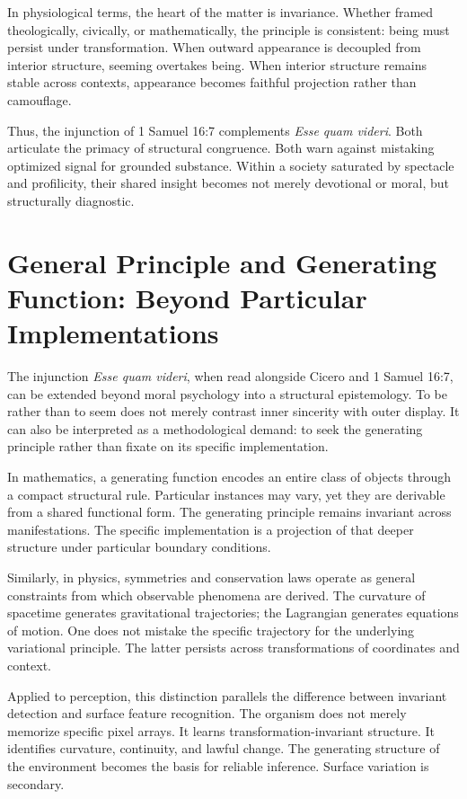 \documentclass[11pt]{article}
\begin{document}
In physiological terms, the heart of the matter is invariance. Whether framed theologically, civically, or mathematically, the principle is consistent: being must persist under transformation. When outward appearance is decoupled from interior structure, seeming overtakes being. When interior structure remains stable across contexts, appearance becomes faithful projection rather than camouflage.

Thus, the injunction of 1 Samuel 16:7 complements \textit{Esse quam videri}. Both articulate the primacy of structural congruence. Both warn against mistaking optimized signal for grounded substance. Within a society saturated by spectacle and profilicity, their shared insight becomes not merely devotional or moral, but structurally diagnostic.

\section{General Principle and Generating Function: Beyond Particular Implementations}

The injunction \textit{Esse quam videri}, when read alongside Cicero and 1 Samuel 16:7, can be extended beyond moral psychology into a structural epistemology. To be rather than to seem does not merely contrast inner sincerity with outer display. It can also be interpreted as a methodological demand: to seek the generating principle rather than fixate on its specific implementation.

In mathematics, a generating function encodes an entire class of objects through a compact structural rule. Particular instances may vary, yet they are derivable from a shared functional form. The generating principle remains invariant across manifestations. The specific implementation is a projection of that deeper structure under particular boundary conditions.

Similarly, in physics, symmetries and conservation laws operate as general constraints from which observable phenomena are derived. The curvature of spacetime generates gravitational trajectories; the Lagrangian generates equations of motion. One does not mistake the specific trajectory for the underlying variational principle. The latter persists across transformations of coordinates and context.

Applied to perception, this distinction parallels the difference between invariant detection and surface feature recognition. The organism does not merely memorize specific pixel arrays. It learns transformation-invariant structure. It identifies curvature, continuity, and lawful change. The generating structure of the environment becomes the basis for reliable inference. Surface variation is secondary.
\end{document}
